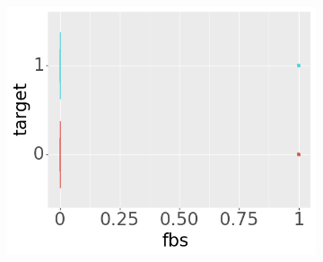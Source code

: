 \begin{figure}[btp]
\begin{subfigure}[b]{0.32\textwidth}
         \includegraphics[width=\textwidth]{plots/target-fbs}
     \end{subfigure}


\end{figure}
